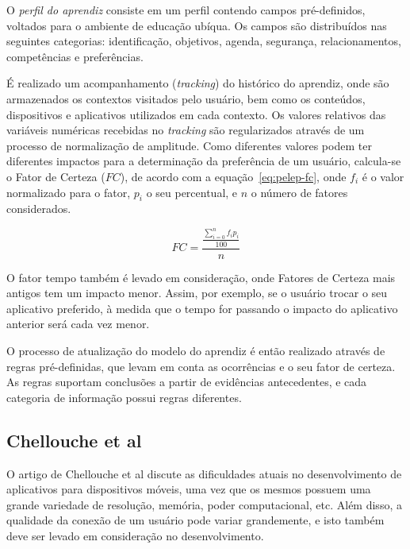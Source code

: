 O \emph{perfil do aprendiz} consiste em um perfil contendo campos pré-definidos, voltados para o ambiente de educação ubíqua. Os campos são distribuídos nas seguintes categorias: identificação, objetivos, agenda, segurança, relacionamentos, competências e preferências. 

É realizado um acompanhamento (\emph{tracking}) do histórico do aprendiz, onde são armazenados os contextos visitados pelo usuário, bem como os conteúdos, dispositivos e aplicativos utilizados em cada contexto. Os valores relativos das variáveis numéricas recebidas no \emph{tracking} são regularizados através de um processo de normalização de amplitude. Como diferentes valores podem ter diferentes impactos para a determinação da preferência de um usuário, calcula-se o Fator de Certeza ($FC$), de acordo com a equação~\ref{eq:pelep-fc}, onde $f_i$ é o valor normalizado para o fator, $p_i$ o seu percentual, e $n$ o número de fatores considerados.

\begin{equation}
  FC = \frac{\frac{\displaystyle\sum_{i=0}^n f_i p_i}{100}}{n}
  \label{eq:pelep-fc}
\end{equation}

O fator tempo também é levado em consideração, onde Fatores de Certeza mais antigos tem um impacto menor. Assim, por exemplo, se o usuário trocar o seu aplicativo preferido, à medida que o tempo for passando o impacto do aplicativo anterior será cada vez menor.

O processo de atualização do modelo do aprendiz é então realizado através de regras pré-definidas, que levam em conta as ocorrências e o seu fator de certeza. As regras suportam conclusões a partir de evidências antecedentes, e cada categoria de informação possui regras diferentes.


\subsection{Chellouche et al}

O artigo de Chellouche et al\cite{chellouche10} discute as dificuldades atuais no desenvolvimento de aplicativos para dispositivos móveis, uma vez que os mesmos possuem uma grande variedade de resolução, memória, poder computacional, etc. Além disso, a qualidade da conexão de um usuário pode variar grandemente, e isto também deve ser levado em consideração no desenvolvimento.

